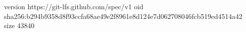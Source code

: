 version https://git-lfs.github.com/spec/v1
oid sha256:b294b9358d8f93ccfa68ae49e2f8961e8d124e7d062708046fcb519ed4514a42
size 43840
